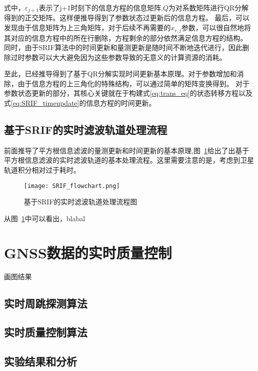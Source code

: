 式中，\(\varepsilon_{j+1}\)表示了j+1时刻下的信息方程的信息矩阵,\(Q\)为对系数矩阵进行QR分解得到的正交矩阵。这样便推导得到了参数状态过更新后的信息方程。
最后，可以发现由于信息矩阵为上三角矩阵，对于后续不再需要的\(x_{r,j}\)参数，可以很自然地将其对应的信息方程中的所在行删除，方程剩余的部分依然满足信息方程的结构。
同时，由于SRIF算法中的时间更新和量测更新是随时间不断地迭代进行，因此删除过时参数可以大大避免因为这些参数导致的无意义的计算资源的消耗。

至此，已经推导得到了基于QR分解实现时间更新基本原理。对于参数增加和消除，由于信息方程的上三角化的特殊结构，可以通过简单的矩阵变换得到。
对于参数状态更新的部分，其核心关键就在于构建式\eqref{eq:trans_eq}的状态转移方程以及式\eqref{eq:SRIF_timeupdate}的信息方程的时间更新。

\subsection{基于SRIF的实时滤波轨道处理流程}

前面推导了平方根信息滤波的量测更新和时间更新的基本原理,图~\ref{fig:SRIF_flowchart}给出了出基于平方根信息滤波的实时滤波轨道的基本处理流程。这里需要注意的是，考虑到卫星轨道积分相对过于耗时。

\begin{figure}
  \centering
  \texttt{[image: SRIF\_flowchart.png]}
  \caption{基于SRIF的实时滤波轨道处理流程图}
  \label{fig:SRIF_flowchart}
\end{figure}

从图~\ref{fig:SRIF_flowchart}中可以看出，blabal

\section{GNSS数据的实时质量控制}

画图结果

\subsection{实时周跳探测算法}

\subsection{实时质量控制算法}


\subsection{实验结果和分析}

